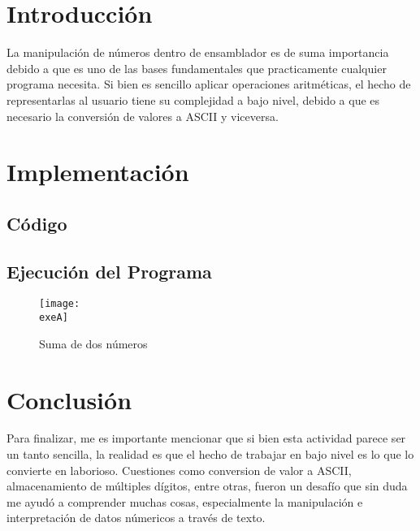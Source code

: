     \restoregeometry %

    \clearpage
    \tableofcontents

    \clearpage
    \listoffigures


    \clearpage
    \lstlistoflistings

    \clearpage
    \vspace*{6pt}
	\centerline{\textbf{\huge \theTitle}}
    \vspace*{8pt}


	\section{Introducción}

	La manipulación de números dentro de ensamblador es de suma importancia debido a que es uno de las bases fundamentales que practicamente cualquier programa necesita. Si bien es sencillo aplicar operaciones aritméticas, el hecho de representarlas al usuario tiene su complejidad a bajo nivel, debido a que es necesario la conversión de valores a ASCII y viceversa.


	\clearpage
	\section{Implementación}

	\subsection{Código}

	

	\subsection{Ejecución del Programa}

	\begin{figure}[h]
		\centering
		\texttt{[image: \\exeA]}
		\caption{Suma de dos números}
	\end{figure}

	\clearpage
	\section{Conclusión}

	Para finalizar, me es importante mencionar que si bien esta actividad parece ser un tanto sencilla, la realidad es que el hecho de trabajar en bajo nivel es lo que lo convierte en laborioso. Cuestiones como conversion de valor a ASCII, almacenamiento de múltiples dígitos, entre otras, fueron un desafío que sin duda me ayudó a comprender muchas cosas, especialmente la manipulación e interpretación de datos númericos a través de texto.


